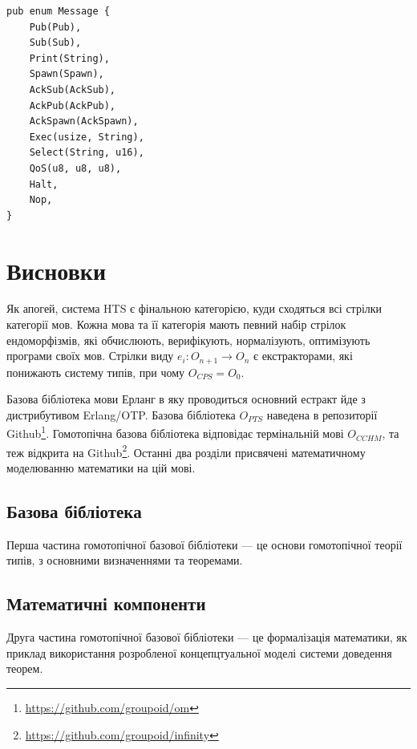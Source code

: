 \begin{lstlisting}
pub enum Message {
    Pub(Pub),
    Sub(Sub),
    Print(String),
    Spawn(Spawn),
    AckSub(AckSub),
    AckPub(AckPub),
    AckSpawn(AckSpawn),
    Exec(usize, String),
    Select(String, u16),
    QoS(u8, u8, u8),
    Halt,
    Nop,
}
\end{lstlisting}

\newpage
\section{Висновки}

Як апогей, система HTS є фінальною категорією,
куди сходяться всі стрілки категорії мов. Кожна мова та її категорія
мають певний набір стрілок ендоморфізмів, які обчислюють, верифікують,
нормалізують, оптимізують програми своїх мов.
Стрілки виду $e_i: O_{n+1} \rightarrow O_n$ є екстракторами, які понижають систему типів,
при чому $O_{CPS} = O_0$.

Базова бібліотека мови Ерланг в яку проводиться основний
естракт йде з дистрибутивом Erlang/OTP. Базова бібліотека
$O_{PTS}$ наведена в репозиторії Github\footnote{\url{https://github.com/groupoid/om}}.
Гомотопічна базова бібліотека відповідає термінальній мові $O_{CCHM}$, та теж відкрита
на Github\footnote{\url{https://github.com/groupoid/infinity}}.
Останні два розділи присвячені математичному моделюванню математики на цій мові.

\subsection{Базова бібліотека}

Перша частина гомотопічної базової бібліотеки --- це основи гомотопічної теорії типів,
з основними визначеннями та теоремами.

\subsection{Математичні компоненти}

Друга частина гомотопічної базової бібліотеки --- це формалізація математики, як
приклад використання розробленої концепцтуальної моделі системи доведення теорем.

